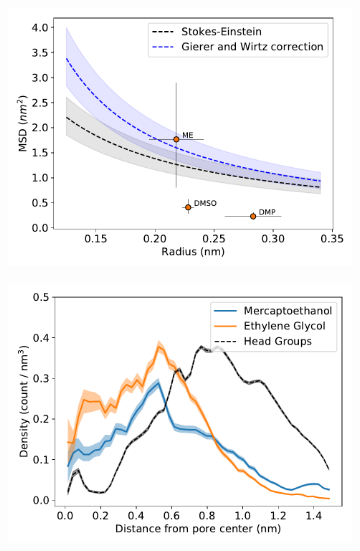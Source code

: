 \documentclass{article}
\begin{document}
  \begin{figure}
  \centering
  \begin{subfigure}{0.45\linewidth}
  \includegraphics[width=\textwidth]{msd_radius_sulfur_10wt.pdf}
  \caption{}\label{fig:SOH_GCL_comparison}
  \end{subfigure}
  \begin{subfigure}{0.45\linewidth}
  \includegraphics[width=\textwidth]{thiol_comparison_SOH.pdf}
  \caption{}\label{fig:SOH_GCL_comparison}
  \end{subfigure}
  \begin{subfigure}{0.45\linewidth}

\end{subfigure}
\end{figure}
\end{document}
